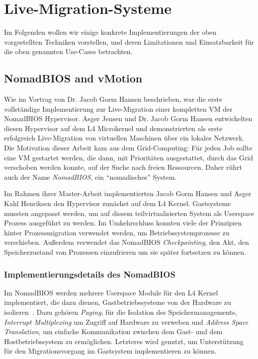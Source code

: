 \section{Live-Migration-Systeme}
\label{sec:live-migr-syst}
Im Folgenden wollen wir einige konkrete Implementierungen der oben
vorgestellten Techniken vorstellen, und deren Limitationen und
Einsatzbarkeit für die oben genannten Use-Cases betrachten.

\subsection{NomadBIOS and vMotion}
\label{sec:nomadbios--vmware}
Wie im Vortrag von Dr. Jacob Gorm Hansen beschrieben, war die erste
vollständige Implementierung zur Live-Migration einer kompletten VM
der NomadBIOS Hypervisor. Asger Jensen und Dr. Jacob Gorm Hansen
entwickelten diesen Hypervisor auf dem L4 Microkernel und
demonstrierten als erste erfolgreich Live-Migration von virtuellen
Maschinen über ein lokales Netzwerk. Die Motivation dieser Arbeit kam
aus dem Grid-Computing: Für jeden Job sollte eine VM gestartet werden,
die dann, mit Prioritäten ausgestattet, durch das Grid verschoben
werden konnte, auf der Suche nach freien Ressourcen. Daher rührt auch
der Name \emph{NomadBIOS}, ein "`nomadisches"' System.

Im Rahmen ihrer Master-Arbeit implementierten Jacob Gorm Hansen und
Asger Kahl Henriksen den Hypervisor zunächst auf dem L4
Kernel. Gastsysteme mussten angepasst werden, um auf diesem
teilvirtualisierten System als Userspace Prozess ausgeführt zu
werden. Im Umkehrschluss konnten viele der Prinzipien hinter
Prozessmigration verwendet werden, um Betriebssystemprozesse zu
verschieben. Außerdem verwendet das NomadBIOS \emph{Checkpointing},
den Akt, den Speicherzustand von Prozessen einzufrieren um sie später
fortsetzen zu können.

\subsubsection{Implementierungsdetails des NomadBIOS}
\label{sec:impl-des-nomadb}
Im NomadBIOS werden mehrere Userspace Module für den L4 Kernel
implementiert, die dazu dienen, Gastbetriebssysteme von der Hardware
zu isolieren~\cite{hansen2002nomadic}. Dazu gehören \emph{Paging}, für
die Isolation des Speichermanagements, \emph{Interrupt Multiplexing}
um Zugriff auf Hardware zu verweben und \emph{Address Space
  Translation}, um einfache Kommunikation zwischen dem Gast- und dem
Hostbetriebssystem zu ermöglichen. Letzteres wird genutzt, um
Unterstützung für den Migrationsvorgang im Gastsystem implementieren
zu können.

